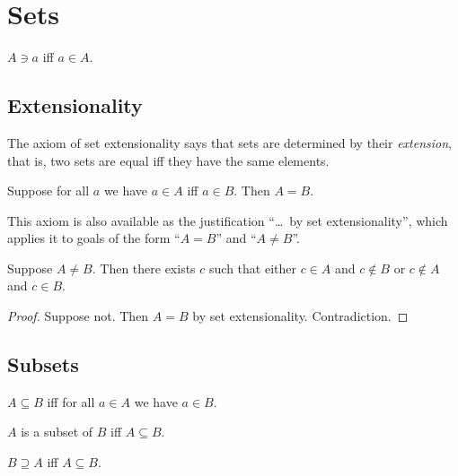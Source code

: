 \section{Sets}

\begin{abbreviation}\label{ni}
    $A\ni a$ iff $a\in A$.
\end{abbreviation}

\subsection{Extensionality}

The axiom of set extensionality says that sets are determined by their \textit{extension},
that is, two sets are equal iff they have the same elements.
%
\begin{axiom}\label{setext}
    Suppose for all $a$ we have $a\in A$ iff $a\in B$.
    Then $A = B$.
\end{axiom}

This axiom is also available as the justification “{\ldots\ by set extensionality}”,
which applies it to goals of the form “$A = B$” and  “$A \neq B$”.

\begin{proposition}%
\label{neq_witness}
    Suppose $A\neq B$.
    Then there exists $c$ such that
    either $c\in A$ and $c\not\in B$
    or $c\not\in A$ and $c\in B$.
\end{proposition}
\begin{proof}
    Suppose not. Then $A = B$ by set extensionality. Contradiction.
\end{proof}



\subsection{Subsets}

\begin{definition}\label{subseteq}
    $A\subseteq B$ iff
    for all $a\in A$ we have $a\in B$.
\end{definition}

\begin{abbreviation}\label{is_subset}
    $A$ is a subset of $B$ iff $A\subseteq B$.
\end{abbreviation}

\begin{abbreviation}\label{supseteq}
    $B\supseteq A$ iff $A\subseteq B$.
\end{abbreviation}

